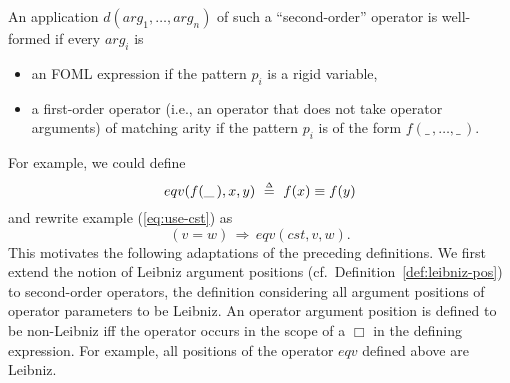 \documentclass[a4paper,fleqn,envcountsame,orivec]{llncs}
\newcommand{\implies}{\Rightarrow}
\newcommand{\edmargin}[2]{\marginpar{\raggedright\footnotesize\color{red}#1: #2}}
\newcommand{\edmargin}[2]{}
\def\llmargin{\edmargin{LL}}
\begin{document}
An application $d(arg_1, \ldots, arg_n)$ of such a ``second-order'' operator is
well-formed if every $arg_i$ is
\begin{itemize}
\item an FOML expression if the pattern $p_i$ is a rigid variable,
\item a first-order operator (i.e., an operator that does not take operator
  arguments) of matching arity if the pattern $p_i$ is of the form
  $f(\_\,,\ldots,\_\,)$.
\end{itemize}
%
For example, we could define
\[
  eqv(f(\_\,),x,y)\ \mathrel{\stackrel{\scriptscriptstyle\Delta}{=}}\ f(x) \equiv f(y)
\]
and rewrite example (\ref{eq:use-cst}) as
%
\begin{equation}\label{eq:second-order}
  (v=w) \,\implies\, eqv(cst,v,w).
\end{equation}
%
This motivates the following adaptations of the preceding definitions. We first
extend the notion of Leibniz argument positions
(cf.\
Definition~\ref{def:leibniz-pos}) to second-order operators,
the definition
considering all
argument positions of operator parameters to be Leibniz. An
operator argument position is
defined to be
non-Leibniz iff the operator occurs in the scope of
a $\Box$ in the defining expression. For example, all positions of the operator
$eqv$ defined above are Leibniz.
\end{document}
